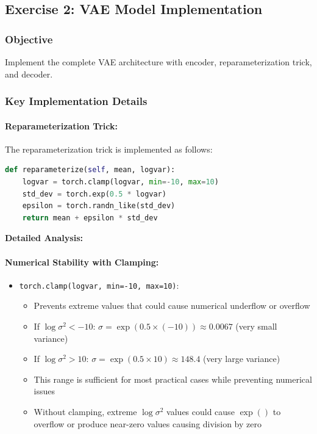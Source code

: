 \documentclass[conference]{IEEEtran}
\newcommand{\logvar}{\log \sigma^2}
\begin{document}
\subsection{Exercise 2: VAE Model Implementation}

\subsubsection{Objective}
Implement the complete VAE architecture with encoder, reparameterization trick, and decoder.

\subsubsection{Key Implementation Details}

\paragraph{Reparameterization Trick:}
The reparameterization trick is implemented as follows:
\begin{lstlisting}[language=Python]
def reparameterize(self, mean, logvar):
    logvar = torch.clamp(logvar, min=-10, max=10)
    std_dev = torch.exp(0.5 * logvar)
    epsilon = torch.randn_like(std_dev)
    return mean + epsilon * std_dev
\end{lstlisting}

\textbf{Detailed Analysis:}

\paragraph{Numerical Stability with Clamping:}
\begin{itemize}
    \item \texttt{torch.clamp(logvar, min=-10, max=10)}: 
    \begin{itemize}
        \item Prevents extreme values that could cause numerical underflow or overflow
        \item If $\logvar < -10$: $\sigma = \exp(0.5 \times (-10)) \approx 0.0067$ (very small variance)
        \item If $\logvar > 10$: $\sigma = \exp(0.5 \times 10) \approx 148.4$ (very large variance)
        \item This range is sufficient for most practical cases while preventing numerical issues
        \item Without clamping, extreme $\logvar$ values could cause $\exp()$ to overflow or produce near-zero values causing division by zero
    \end{itemize}
\end{itemize}
\end{document}
